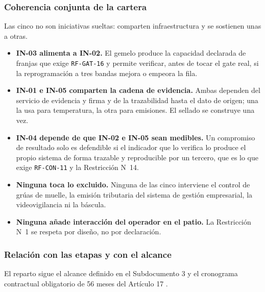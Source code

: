 \subsubsection{Coherencia conjunta de la cartera}

Las cinco no son iniciativas sueltas: comparten infraestructura y se sostienen
unas a otras.

\begin{itemize}[leftmargin=*, itemsep=3pt]
  \item \textbf{IN-03 alimenta a IN-02.} El gemelo produce la capacidad
    declarada de franjas que exige \texttt{RF-GAT-16} y permite verificar,
    antes de tocar el gate real, si la reprogramación a tres bandas mejora o
    empeora la fila.
  \item \textbf{IN-01 e IN-05 comparten la cadena de evidencia.} Ambas dependen
    del servicio de evidencia y firma y de la trazabilidad hasta el dato de
    origen; una la usa para temperatura, la otra para emisiones. El sellado se
    construye una vez.
  \item \textbf{IN-04 depende de que IN-02 e IN-05 sean medibles.} Un
    compromiso de resultado solo es defendible si el indicador que lo verifica
    lo produce el propio sistema de forma trazable y reproducible por un
    tercero, que es lo que exige \texttt{RF-CON-11} y la Restricción
    N\textdegree{}~14.
  \item \textbf{Ninguna toca lo excluido.} Ninguna de las cinco interviene el
    control de grúas de muelle, la emisión tributaria del sistema de gestión
    empresarial, la videovigilancia ni la báscula.
  \item \textbf{Ninguna añade interacción del operador en el patio.} La
    Restricción N\textdegree{}~1 se respeta por diseño, no por declaración.
\end{itemize}

\subsubsection{Relación con las etapas y con el alcance}

El reparto sigue el alcance definido en el Subdocumento 3 y el cronograma
contractual obligatorio de 56 meses del Artículo 17\textdegree{} \Hecho.


